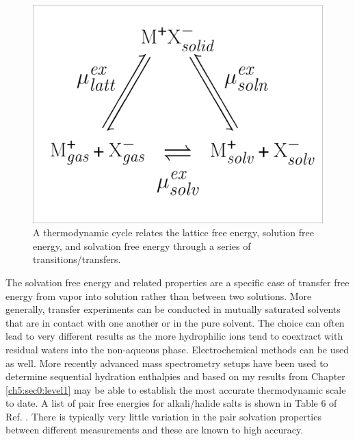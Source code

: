 \begin{intro}
\begin{figure}
 \begin{center}
  \includegraphics[width=0.98\linewidth,trim=0.2cm 2.2cm 0.2cm 0.2cm,clip=true]{images/thermocycle.pdf}
  \caption[Schematic of the thermodynamic cycle]{A thermodynamic cycle relates the lattice free energy, solution free energy, and solvation free energy through a series of 
  transitions/transfers.}
  \label{fig:thermocycle}
 \end{center} 
\end{figure}     
   
   The solvation free energy and related properties are a specific case of transfer free energy from vapor into solution rather than between two solutions. More generally, 
   transfer experiments can be conducted in mutually saturated solvents that are in contact with one another or in the pure solvent. The choice can often lead to very different 
   results as the more hydrophilic ions tend to coextract with residual waters into the non-aqueous phase\cite{rose2009, darvas2011, darvas2013}. Electrochemical
   methods can be used as well\cite{gomer1977experimental,randles1956real}. More recently advanced mass spectrometry setups have been used to determine sequential hydration
   enthalpies and based on my results from Chapter \ref{ch5:sec0:level1} may be able to establish the most accurate thermodynamic scale to date\cite{wheeler2015hydration,bard2014electroanalytical}.
   A list of pair free energies for alkali/halide salts is shown in Table 6 of Ref. \cite{lamoureux2006absolute}. There is typically very little variation in the pair
   solvation properties between different measurements and these are known to high accuracy\cite{ren2003amoebaion}. 
   

\end{intro}
